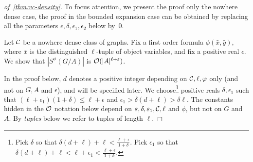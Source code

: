 \begin{proof}[of~\cref{thm:vc-density}]
%
	
 To focus attention, we present the proof only the nowhere dense case, the proof in the bounded expansion case
 can be obtained by replacing  all the parameters $\epsilon,\delta,\epsilon_1,\epsilon_2$ below by~$0$.

 Let $\CCC$ be a nowhere dense class of graphs.
  Fix a first order formula $\phi(\bar x,\bar y)$, where $\bar x$ is the distinguished $\ell$-tuple of object variables, and
	   fix a positive real $\epsilon$. 	   We show that $|S^\phi(G/A)|$ is $\Oof(|A|^{\ell+\epsilon})$.
     
	   

	   \medskip
	   
	   
	   
In the proof below, $d$ denotes a positive integer 
depending on ${\cal C},\ell,\phi$ only (and not on $G, A$ and $\epsilon$), and will be specified later. We choose\footnote{Pick $\delta$ so that	 
$\delta(d+\ell)+\ell<\frac{\ell+\epsilon}{1+\delta}$. Pick $\epsilon_1$ so that $\delta(d+\ell)+\ell<\ell+\epsilon_1<\frac{\ell+\epsilon}{1+\delta}$.} positive reals
$\delta,\epsilon_1$  such that 
	 $(\ell+\epsilon_1)(1+\delta) 
	 \le
	 \ell+\epsilon$ and $\epsilon_1>\delta(d+\ell)> \delta\ell$.	 
The constants hidden in the $\Oof$ notation below depend
 on $\epsilon,\delta,\epsilon_1,\cal C, \ell$ and $\phi$, but not on $G$ and $A$.   By \emph{tuples} below we refer to tuples of length $\ell$.


\end{proof}
